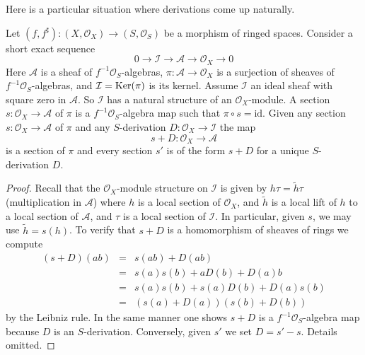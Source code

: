 \noindent
Here is a particular situation where derivations come up
naturally.

\begin{lemma}
\label{lemma-double-structure-gives-derivation}
Let $(f, f^\sharp) : (X, \mathcal{O}_X) \to (S, \mathcal{O}_S)$
be a morphism of ringed spaces. Consider a short exact sequence
$$
0 \to \mathcal{I} \to \mathcal{A} \to \mathcal{O}_X \to 0
$$
Here $\mathcal{A}$ is a sheaf of $f^{-1}\mathcal{O}_S$-algebras,
$\pi : \mathcal{A} \to \mathcal{O}_X$ is a surjection
of sheaves of $f^{-1}\mathcal{O}_S$-algebras, and
$\mathcal{I} = \mathop{\mathrm{Ker}}(\pi)$ is its kernel. Assume $\mathcal{I}$ an ideal
sheaf with square zero in $\mathcal{A}$. So $\mathcal{I}$
has a natural structure of an $\mathcal{O}_X$-module.
A section $s : \mathcal{O}_X \to \mathcal{A}$ of $\pi$
is a $f^{-1}\mathcal{O}_S$-algebra map such that $\pi \circ s = \text{id}$.
Given any section $s : \mathcal{O}_X \to \mathcal{A}$
of $\pi$ and any $S$-derivation $D : \mathcal{O}_X \to \mathcal{I}$
the map
$$
s + D : \mathcal{O}_X \to \mathcal{A}
$$
is a section of $\pi$ and every section $s'$ is of the form $s + D$
for a unique $S$-derivation $D$.
\end{lemma}

\begin{proof}
Recall that the $\mathcal{O}_X$-module structure on $\mathcal{I}$
is given by $h \tau = \tilde h \tau$ (multiplication in $\mathcal{A}$)
where $h$ is a local section of $\mathcal{O}_X$, and
$\tilde h$ is a local lift of $h$ to a local
section of $\mathcal{A}$, and $\tau$ is a local section of $\mathcal{I}$.
In particular, given $s$, we may use $\tilde h = s(h)$.
To verify that $s + D$ is a homomorphism of sheaves of rings we
compute
\begin{eqnarray*}
(s + D)(ab) & = & s(ab) + D(ab) \\
& = & s(a)s(b) + aD(b) + D(a)b \\
& = & s(a) s(b) + s(a)D(b) + D(a)s(b) \\
& = & (s(a) + D(a))(s(b) + D(b))
\end{eqnarray*}
by the Leibniz rule. In the same manner one shows
$s + D$ is a $f^{-1}\mathcal{O}_S$-algebra
map because $D$ is an $S$-derivation. Conversely, given $s'$ we set
$D = s' - s$. Details omitted.
\end{proof}

